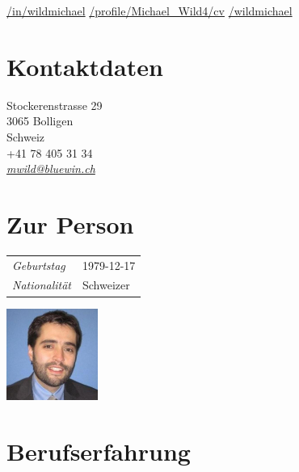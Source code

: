 \documentclass[line,11pt,a4paper]{resume}
\newcommand{\mail}[1]{\textsl{\href{mailto:#1}{#1}}}
\begin{document}
\begin{resume}
\vspace{-4mm}
\-\hspace{-12.3mm}\begin{minipage}{15cm}
\href{https://linkedin.com/in/wildmichael}{\faLinkedinSquare/in/wildmichael}\quad
\href{https://xing.com/profile/Michael_Wild4/cv}{\faXingSquare/profile/Michael\_Wild4/cv}\quad
\href{https://github.com/wildmichael}{\faGithubSquare/wildmichael}
\end{minipage}


\begin{multicols}{3}

\section{\mysidestyle Kontaktdaten}\vspace{0.9mm}
Stockerenstrasse 29 \\
3065 Bolligen \\
Schweiz \\
+41 78 405 31 34 \\
\mail{mwild@bluewin.ch}\\

\columnbreak

\section{\mysidestyle Zur Person}\vspace{2mm}

\begin{tabular}{@{}ll}
\textsl{Geburtstag} & 1979-12-17 \\
\textsl{Nationalität}   & Schweizer
\end{tabular}

\columnbreak
\vspace*{-9mm}\hfill\includegraphics[width=30mm]{mwild}

\end{multicols}

\section{\mysidestyle Berufserfahrung}\vspace{2mm}


\end{resume}
\end{document}
